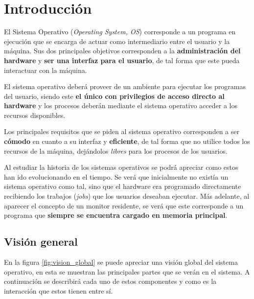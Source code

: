 %
%
%
%

\chapter{Introducción}
El Sistema Operativo (\textit{Operating System, OS}) corresponde a un programa
en ejecución que se encarga de actuar como intermediario entre el usuario y la
máquina. Sus dos principales objetivos corresponden a la \textbf{administración
del hardware} y \textbf{ser una interfaz para el usuario}, de tal forma que este
pueda interactuar con la máquina.

El sistema operativo deberá proveer de un ambiente para ejecutar los programas
del usuario, siendo este \textbf{el único con privilegios de acceso directo al
hardware} y los procesos deberán mediante el sistema operativo acceder a los
recursos disponibles.

Los principales requisitos que se piden al sistema operativo corresponden a ser
\textbf{cómodo} en cuanto a su interfaz y \textbf{eficiente}, de tal forma que
no utilice todos los recursos de la máquina, dejándolos \textit{libres} para los
procesos de los usuarios.

Al estudiar la historia de los sistemas operativos se podrá apreciar como estos
han ido evolucionando en el tiempo. Se verá que inicialmente no existía un
sistema operativo como tal, sino que el hardware era programado directamente
recibiendo los trabajos (\textit{jobs}) que los usuarios deseaban ejecutar. Más
adelante, al aparecer el concepto de un monitor residente, se verá que este
corresponde a un programa que \textbf{siempre se encuentra cargado en memoria
principal}.

\section{Visión general}

En la figura \ref{fig:vision_global} se puede apreciar una visión global del
sistema operativo, en esta se muestran las principales partes que se verán en el
sistema. A continuación se describirá cada uno de estos componentes y como es la
interacción que estos tienen entre sí.

